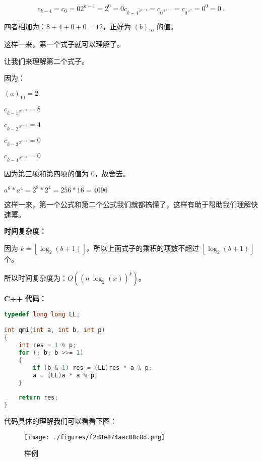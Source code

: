 $$
c_{k - 4} = c_0 = 0
2 ^ {k - 4} = 2 ^ 0 = 0
c_{{k-4}^{\ 2^{\ k-4}}} = c_{{0}^{\ 2^{\ k-4}}} = c_{{0}^{\ 2^{\ 0}}} = 0^0 = 0~.
$$


四者相加为：$8 + 4 + 0 + 0 = 12$，正好为 $(b) _ {10}$ 的值。

这样一来，第一个式子就可以理解了。

让我们来理解第二个式子。

因为：

$(a)_{10} = 2$

$c_{{k-1}^{\ 2^{\ k-1}}} = 8$

$c_{{k-2}^{\ 2^{\ k-2}}} = 4$

$c_{{k-3}^{\ 2^{\ k-3}}} = 0$

$c_{{k-4}^{\ 2^{\ k-4}}} = 0$

因为第三项和第四项的值为 $0$，故舍去。 

$a ^ 8 * a ^ 4 = 2 ^ 8 * 2 ^ 4 = 256 * 16 = 4096$

这样一来，第一个公式和第二个公式我们就都搞懂了，这样有助于帮助我们理解快速幂。

\textbf{时间复杂度：}

因为 $k=\left\lfloor{\log_2(b+1)}\right\rfloor$，所以上面式子的乘积的项数不超过 $\left\lfloor{\log_2(b+1)}\right\rfloor$ 个。

所以时间复杂度为：$O((n\ \log_2(x))^k)$。

\textbf{C++ 代码：}

\begin{lstlisting}[language=cpp]
typedef long long LL;

int qmi(int a, int b, int p)
{
    int res = 1 % p;
    for (; b; b >>= 1)
    {
        if (b & 1) res = (LL)res * a % p;
        a = (LL)a * a % p;
    }
    
    return res;
}
\end{lstlisting}

代码具体的理解我们可以看看下图：
\begin{figure}[ht]
\centering
\texttt{[image: ./figures/f2d8e874aac08c8d.png]}
\caption{样例} \label{fig_qmi_2}
\end{figure}
